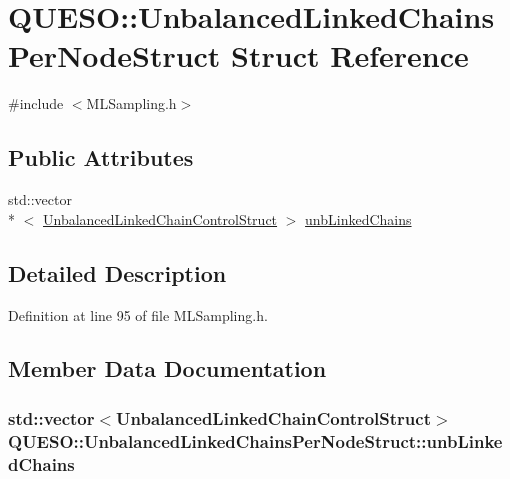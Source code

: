 \hypertarget{struct_q_u_e_s_o_1_1_unbalanced_linked_chains_per_node_struct}{\section{Q\-U\-E\-S\-O\-:\-:Unbalanced\-Linked\-Chains\-Per\-Node\-Struct Struct Reference}
\label{struct_q_u_e_s_o_1_1_unbalanced_linked_chains_per_node_struct}
}


{\ttfamily \#include $<$M\-L\-Sampling.\-h$>$}

\subsection*{Public Attributes}
\begin{DoxyCompactItemize}
\item 
std\-::vector\\*
$<$ \hyperlink{struct_q_u_e_s_o_1_1_unbalanced_linked_chain_control_struct}{Unbalanced\-Linked\-Chain\-Control\-Struct} $>$ \hyperlink{struct_q_u_e_s_o_1_1_unbalanced_linked_chains_per_node_struct_a492f068163c8b833d09179f85bc62db6}{unb\-Linked\-Chains}
\end{DoxyCompactItemize}


\subsection{Detailed Description}


Definition at line 95 of file M\-L\-Sampling.\-h.



\subsection{Member Data Documentation}
\hypertarget{struct_q_u_e_s_o_1_1_unbalanced_linked_chains_per_node_struct_a492f068163c8b833d09179f85bc62db6}{
\subsubsection[{unb\-Linked\-Chains}]{\setlength{\rightskip}{0pt plus 5cm}std\-::vector$<${\bf Unbalanced\-Linked\-Chain\-Control\-Struct}$>$ Q\-U\-E\-S\-O\-::\-Unbalanced\-Linked\-Chains\-Per\-Node\-Struct\-::unb\-Linked\-Chains}}\label{struct_q_u_e_s_o_1_1_unbalanced_linked_chains_per_node_struct_a492f068163c8b833d09179f85bc62db6}



